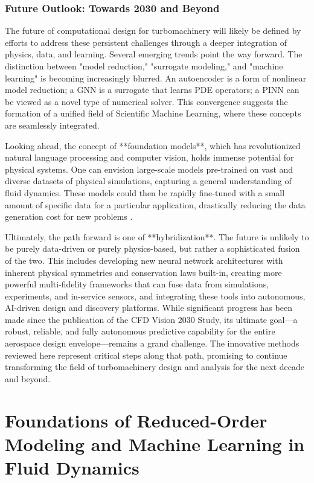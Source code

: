 \documentclass[dsc, EN]{ufabcFHZh}
\begin{document}
\subsection{Future Outlook: Towards 2030 and Beyond}

The future of computational design for turbomachinery will likely be defined by efforts to address these persistent challenges through a deeper integration of physics, data, and learning. Several emerging trends point the way forward. The distinction between "model reduction," "surrogate modeling," and "machine learning" is becoming increasingly blurred. An autoencoder is a form of nonlinear model reduction; a GNN is a surrogate that learns PDE operators; a PINN can be viewed as a novel type of numerical solver. This convergence suggests the formation of a unified field of Scientific Machine Learning, where these concepts are seamlessly integrated.

Looking ahead, the concept of **foundation models**, which has revolutionized natural language processing and computer vision, holds immense potential for physical systems. One can envision large-scale models pre-trained on vast and diverse datasets of physical simulations, capturing a general understanding of fluid dynamics. These models could then be rapidly fine-tuned with a small amount of specific data for a particular application, drastically reducing the data generation cost for new problems \citep{SURF_benchmark}.

Ultimately, the path forward is one of **hybridization**. The future is unlikely to be purely data-driven or purely physics-based, but rather a sophisticated fusion of the two. This includes developing new neural network architectures with inherent physical symmetries and conservation laws built-in, creating more powerful multi-fidelity frameworks that can fuse data from simulations, experiments, and in-service sensors, and integrating these tools into autonomous, AI-driven design and discovery platforms. While significant progress has been made since the publication of the CFD Vision 2030 Study, its ultimate goal—a robust, reliable, and fully autonomous predictive capability for the entire aerospace design envelope—remains a grand challenge. The innovative methods reviewed here represent critical steps along that path, promising to continue transforming the field of turbomachinery design and analysis for the next decade and beyond.

\chapter{Foundations of Reduced-Order Modeling and Machine Learning in Fluid Dynamics}
\end{document}

